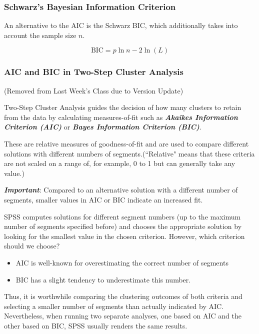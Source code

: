 \begin{frame}
\subsubsection{Schwarz's Bayesian Information Criterion}
An alternative to the AIC is the Schwarz BIC, which additionally takes into account the sample size $n$.

\[\mbox{BIC} = p\ln{n} - 2\ln(L)\]
\end{frame}
\begin{frame}

\frametitle{AIC and BIC in Two-Step Cluster Analysis}

(Removed from Last Week's Class due to Version Update)

Two-Step Cluster Analysis guides the decision of how many clusters to retain from the data by
calculating measures-of-fit such as \textbf{\textit{Akaikes Information Criterion (AIC)}} or \textbf{\textit{Bayes Information Criterion (BIC)}}.
\end{frame}
\begin{frame}
These are relative measures of goodness-of-fit and are used to compare different
solutions with different numbers of segments.(``Relative" means that these criteria
are not scaled on a range of, for example, 0 to 1 but can generally take any value.)


\textbf{\textit{Important}}: Compared to an alternative solution with a different number of segments, smaller
values in AIC or BIC indicate an increased fit.
\end{frame}
\begin{frame}
SPSS computes solutions for different segment numbers (up to the maximum number of segments specified before) and
chooses the appropriate solution by looking for the smallest value in the chosen
criterion. However, which criterion should we choose?
\begin{itemize}
\item AIC is well-known for
overestimating the correct number of segments
\item BIC has a slight tendency
to underestimate this number.
\end{itemize}

Thus, it is worthwhile comparing the clustering
outcomes of both criteria and selecting a smaller number of segments than
actually indicated by AIC. Nevertheless, when running two separate analyses,
one based on AIC and the other based on BIC, SPSS usually renders the same
results.
\end{frame}
